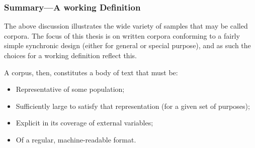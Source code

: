 \subsubsection{Summary---A working Definition}
The above discussion illustrates the wide variety of samples that may be called corpora.  The focus of this thesis is on written corpora conforming to a fairly simple synchronic design (either for general or special purpose), and as such the choices for a working definition reflect this.%

A corpus, then, constitutes a body of text that must be:

\begin{itemize}
    \item Representative of some population;
    \item Sufficiently large to satisfy that representation (for a given set of purposes);
    \item Explicit in its coverage of external variables;
    \item Of a regular, machine-readable format.
\end{itemize}


% 
% 
% 
% 
% 












